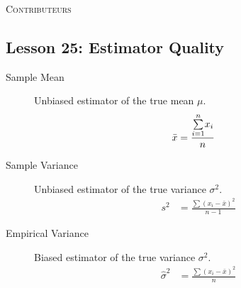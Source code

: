 \documentclass[10pt, french]{article}
\def\SectionColor{cobalt}
\begin{document}
\begin{center}
	\textsc{\Large Contributeurs}\\[0.5cm] 
\end{center}
%

\newpage

\begin{multicols*}{2}

\def\SectionColor{red!80!white}
\section*{Lesson 25: Estimator Quality}
\begin{distributions}
\begin{description}
	\item[Sample Mean]	Unbiased estimator of the true mean $\mu$.
\begin{align*}
	\bar{x}
	&=	\frac{\overset{n}{\underset{i = 1}{\sum}} x_{i}}{n}
\end{align*}
	\item[Sample Variance]	Unbiased estimator of the true variance $\sigma^{2}$.
\begin{align*}
	s^{2} 
	&=	\frac{\sum (x_{i} - \bar{x})^{2}}{n - 1}
\end{align*}
	\item[Empirical Variance]	Biased estimator of the true variance $\sigma^{2}$.
		\begin{align*}
		\hat{\sigma}^{2} 
		&=	\frac{\sum (x_{i} - \bar{x})^{2}}{n}
		\end{align*}
\end{description}

\end{distributions}
\end{multicols*}
\end{document}
